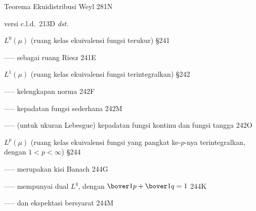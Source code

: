  Teorema Ekuidistribusi Weyl 281N




\indexmedskip




 versi c.l.d.\ 213D {\it dst.}





























$L^0(\mu)$ (ruang kelas ekuivalensi fungsi terukur) \S241

----- sebagai ruang Riesz 241E





















$L^1(\mu)$ (ruang kelas ekuivalensi fungsi terintegralkan) \S242


----- kelengkapan norma 242F

----- kepadatan fungsi sederhana 242M

----- (untuk ukuran Lebesgue) kepadatan fungsi kontinu dan fungsi tangga 242O
















$L^p(\mu)$ (ruang kelas ekuivalensi fungsi yang pangkat ke-$p$-nya terintegralkan, dengan $1<p<\infty$) \S244


----- merupakan kisi Banach 244G

----- mempunyai dual $L^q$, dengan $\bover1p+\bover1q=1$ 244K

----- dan ekspektasi bersyarat 244M









